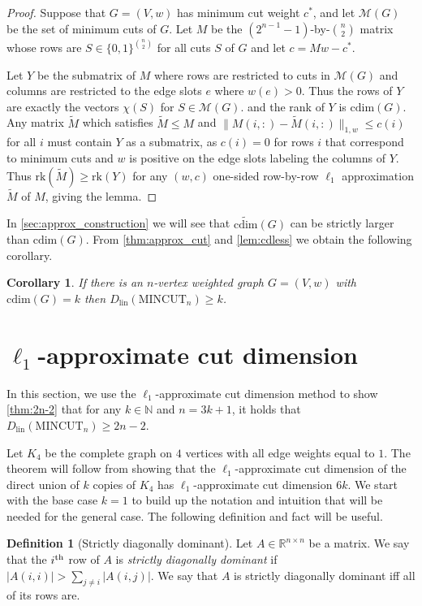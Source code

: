 \documentclass[10pt,a4paper]{article}
\newcommand{\N}{\mathbb{N}}
\newcommand{\R}{\mathbb{R}}
\newcommand{\M}{\mathcal{M}}
\newcommand{\MINCUT}{\mathrm{MINCUT}}
\newcommand{\lin}{\mathrm{lin}}
\newcommand{\ith}{i^{\scriptsize \mbox{{\rm th}}}}
\newcommand{\cd}{\mathrm{cdim}}
\newcommand{\rk}{\mathrm{rk}}
\newcommand{\1}{\mathbf{1}}
\newtheorem{corollary}[theorem]{Corollary}
\theoremstyle{definition}
\newtheorem{definition}[theorem]{Definition}
\begin{document}
\begin{proof}
Suppose that $G = (V,w)$ has minimum cut weight $c^*$, and let $\M(G)$ be the set of minimum cuts of $G$.
Let $M$ be the $(2^{n-1}-1)$-by-$\binom{n}{2}$ matrix whose rows are $S \in \{0,1\}^{\binom{n}{2}}$ for all cuts $S$ of $G$
and let $c = Mw-c^*$.

Let $Y$ be the submatrix of $M$ where rows are restricted to cuts in $\M(G)$ and columns are restricted
to the edge slots $e$ where $w(e) > 0$.  Thus the rows of $Y$ are exactly the vectors $\chi(S)$ for $S \in \M(G)$.
and the rank of $Y$ is $\cd(G)$.  Any matrix $\tilde M$ which satisfies $\tilde M \le M$ and $\|M(i,:)-\tilde{M}(i,:)\|_{1,w} \le c(i)$
for all $i$ must contain $Y$ as a submatrix, as $c(i)=0$ for rows $i$ that correspond to minimum cuts and $w$ is positive on the
edge slots labeling the columns of $Y$.  Thus $\rk(\tilde M) \ge \rk(Y)$ for any $(w,c)$ one-sided row-by-row $\ell_1$ approximation
$\tilde M$ of $M$, giving the lemma.
\end{proof}

In \cref{sec:approx_construction} we will see that $\widetilde{\cd}(G)$ can be strictly larger than $\cd(G)$.  From \cref{thm:approx_cut} and
\cref{lem:cdless} we obtain the following corollary.
\begin{corollary}
\label{cor:cd_linear}
If there is an $n$-vertex weighted graph $G = (V,w)$ with $\cd(G) = k$
then $D_\lin(\MINCUT_n) \ge k$.
\end{corollary}

%


\setcounter{section}{6}\setcounter{theorem}{36}\section{$\ell_1$-approximate cut dimension}
\label{sec:l1-approx}
\label{sec:approx_construction}
In this section, we use the $\ell_1$-approximate cut dimension method to show \cref{thm:2n-2} that
for any $k \in \N$ and $n = 3k+1$, it holds that $D_\lin(\MINCUT_n) \ge 2n-2$.

Let $K_4$ be the complete graph on $4$ vertices with all edge weights equal to $1$.
The theorem will follow from showing that the $\ell_1$-approximate cut dimension of
the direct union of $k$ copies of $K_4$ has $\ell_1$-approximate cut dimension $6k$.
We start with the base case $k=1$ to build up the notation and intuition that will be needed
for the general case.  The following definition and fact will be useful.


\begin{definition}[Strictly diagonally dominant]
Let $A \in \R^{n \times n}$ be a matrix.  We say that the $\ith$ row of $A$ is \emph{strictly diagonally dominant}
if $|A(i,i)| > \sum_{j \ne i} |A(i,j)|$.  We say that $A$ is strictly diagonally dominant iff all of its rows are.
\end{definition}
\end{document}
